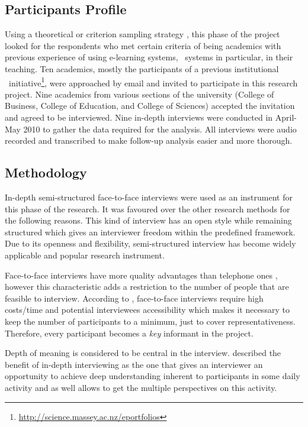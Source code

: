 \subsection{Participants Profile}
Using a theoretical or criterion sampling strategy \citep{Byrne2001,
Warren2001}, this phase of the project looked for the respondents who met
certain criteria of being academics with previous experience of using
e-learning systems, \ep~systems in particular, in their teaching. Ten academics,
mostly the participants of a previous institutional
\ep~initiative\footnote{\url{http://science.massey.ac.nz/eportfolios}}, were
approached by email and invited to participate in this research project. Nine
academics from various sections of the university (College of Business, College
of Education, and College of Sciences) accepted the invitation and agreed to be
interviewed. Nine in-depth interviews were conducted in April-May 2010 to gather
the data required for the analysis. All interviews were audio recorded and
transcribed to make follow-up analysis easier and more thorough.

\subsection{Methodology}

In-depth semi-structured face-to-face interviews were used as an instrument for
this phase of the research. It was favoured over the other research methods for
the following reasons. This kind of interview has an open style while remaining
structured \citep{Gillham2000} which gives an interviewer freedom within the
predefined framework. Due to its openness and flexibility, semi-structured
interview has become widely applicable and popular research instrument.

Face-to-face interviews have more quality advantages than telephone ones
\citep{Shuy2001}, however this characteristic adds a restriction to the number
of people that are feasible to interview. According to \citet{Gillham2000},
face-to-face interviews require high costs/time and potential interviewees
accessibility which makes it necessary to keep the number of participants to a
minimum, just to cover representativeness. Therefore, every participant becomes
a \textit{key} informant in the project.

Depth of meaning is considered to be central in the interview.
\citet{Johnson2001} described the benefit of in-depth interviewing as the one
that gives an interviewer an opportunity to achieve deep understanding inherent
to participants in some daily activity and as well allows to get the multiple
perspectives on this activity.

